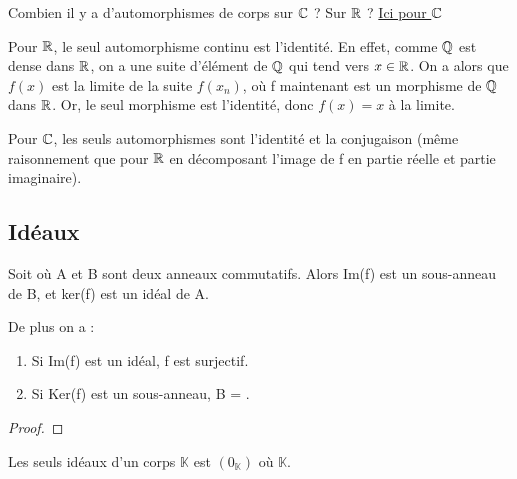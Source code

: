 \begin{question}
	Combien il y a d'automorphismes de corps sur $\mathbb{C}$ ? Sur $\mathbb{R}$ ?
	\href{http://www.math.uga.edu/~pete/Kestelman51.pdf}{Ici pour $\mathbb{C}$}

	Pour $\mathbb{R}$, le seul automorphisme continu est l'identité. En effet, comme
	$\mathbb{Q}$ est dense dans $\mathbb{R}$, on a une suite d'élément de $\mathbb{Q}$
	qui tend vers $x \in \mathbb{R}$. On a alors que $f(x)$ est la limite de la suite
	$f(x_{n})$, où f maintenant est un morphisme de $\mathbb{Q}$ dans $\mathbb{R}$.
	Or, le seul morphisme est l'identité, donc $f(x) = x$ à la limite.

	Pour $\mathbb{C}$, les seuls automorphismes sont l'identité et la conjugaison
	(même raisonnement que pour $\mathbb{R}$ en décomposant l'image de f en partie
	réelle et partie imaginaire).
\end{question}

\subsection{Idéaux}

\begin{definition} [Idéal]
	
\end{definition}

\begin{exemple}
	
\end{exemple}

\begin{proposition}
	Soit  où A et B sont deux anneaux commutatifs. Alors
	Im(f) est un sous-anneau de B, et ker(f) est un idéal de A.

	De plus on a :
	\begin{enumerate}
		\item Si Im(f) est un idéal, f est surjectif.
		\item Si Ker(f) est un sous-anneau, B = .
	\end{enumerate}
\end{proposition}

\begin{proof}
	
\end{proof}

\begin{proposition}
	Les seuls idéaux d'un corps $\mathbb{K}$ est $(0_{\mathbb{K}})$ où
	$\mathbb{K}$.
\end{proposition}

